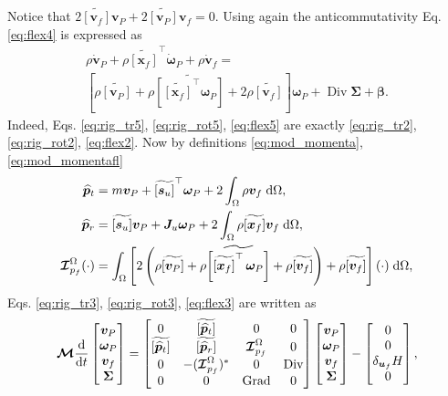\documentclass{svjour3}                     %
\DeclareMathOperator*{\Grad}{Grad}
\DeclareMathOperator*{\Div}{Div}
\newcommand{\crmat}[1]{\ensuremath{\widetilde{\left[#1\right]}}}
\begin{document}
	Notice that $2 \crmat{\bm{v}_f}\bm{v}_P + 2 \crmat{\bm{v}_P}\bm{v}_f = 0$. Using again the anticommutativity Eq. \eqref{eq:flex4} is expressed as 
	\begin{equation}
	\label{eq:flex5}
	\begin{split}
	\rho \dot{\bm{v}}_P + \rho \crmat{\bm{x}_f}^\top \dot{\bm\omega}_P  + \rho \dot{\bm{v}}_f = \\
	\left[\rho \crmat{\bm{v}_P} + \rho \crmat{\crmat{\bm{x}_f}^\top \bm\omega_P} + 2 \rho \crmat{\bm{v}_f} \right] \bm\omega_P + \Div{\bm\Sigma} + \bm\beta.
	\end{split}
	\end{equation}
	Indeed, Eqs. \eqref{eq:rig_tr5}, \eqref{eq:rig_rot5}, \eqref{eq:flex5} are exactly \eqref{eq:rig_tr2}, \eqref{eq:rig_rot2}, \eqref{eq:flex2}. Now by definitions \eqref{eq:mod_momenta}, \eqref{eq:mod_momentafl}
	\begin{align*}
	\widehat{\bm{p}}_t &= m \bm{v}_P + \crmat{\bm{s}_u}^\top \bm\omega_P +2 \int_{\Omega} \rho \bm{v}_f \d{\Omega}, \\
	\widehat{\bm{p}}_r &= \crmat{\bm{s}_u} \bm{v}_P + \bm{J}_u \bm\omega_P + 2 \int_{\Omega} \rho \crmat{\bm{x}_f} {\bm{v}}_f \d{\Omega}, \\
	\bm{\mathcal{I}}_{p_f}^\Omega(\cdot) &= \int_{\Omega} \left[ 2 \left(\rho \crmat{\bm{v}_P} + \rho \crmat{\crmat{\bm{x}_f}^\top \, \bm\omega_P} +\rho \crmat{\bm{v}_f}\right) + \rho \crmat{\bm{v}_f} \right] (\cdot) \d{\Omega}, 
	\end{align*}
	Eqs. \eqref{eq:rig_tr3}, \eqref{eq:rig_rot3}, \eqref{eq:flex3} are written as 
	\begin{equation}
	\bm{\mathcal{M}}
	\diff{}{t}
	\begin{bmatrix}
	\bm{v}_P \\ \bm\omega_P  \\ \bm{v}_f  \\ \bm\Sigma \\
	\end{bmatrix} = 
	\begin{bmatrix}
	0 & \crmat{\widehat{\bm{p}}_t} & 0 & 0 \\
	\crmat{\widehat{\bm{p}}_t} & \crmat{\widehat{\bm{p}}_r} & \bm{\mathcal{I}}_{p_f}^\Omega & 0 \\
	0 & -(\bm{\mathcal{I}}_{p_f}^\Omega)^* & 0 & \Div \\
	0 & 0 & \Grad & 0 \\
	\end{bmatrix}
	\begin{bmatrix}
	\bm{v}_P \\ \bm\omega_P  \\ \bm{v}_f  \\ \bm\Sigma \\
	\end{bmatrix} - 
	\begin{bmatrix}
	0 \\ 0  \\ \delta_{\bm{u}_f}H  \\ 0 \\
	\end{bmatrix},
	\end{equation} 
\end{document}
